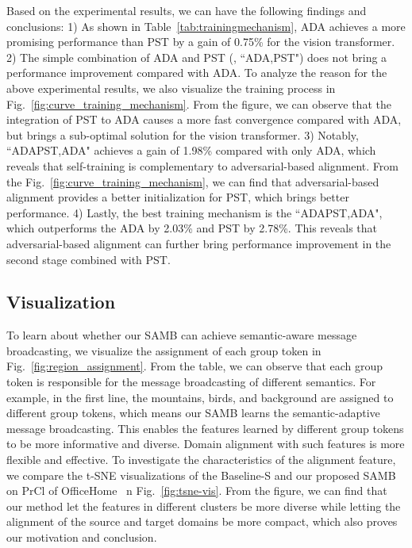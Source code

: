 \documentclass[journal]{IEEEtran}
\begin{document}
Based on the experimental results, we can have the following findings and conclusions:
1) As shown in Table~\ref{tab:trainingmechanism}, ADA achieves a more promising performance than PST by a gain of 0.75\% for the vision transformer. 2) The simple combination of ADA and PST (\ieno,  ``ADA,PST") does not bring a performance improvement compared with ADA. To analyze the reason for the above experimental results, we also visualize the training process in Fig.~\ref{fig:curve_training_mechanism}. From the figure, we can observe that the integration of PST to ADA causes a more fast convergence compared with ADA, but brings a sub-optimal solution for the vision transformer. 3) Notably, ``ADAPST,ADA" achieves a gain of 1.98\% compared with only ADA, which reveals that self-training is complementary to adversarial-based alignment. From the Fig.~\ref{fig:curve_training_mechanism}, we can find that adversarial-based alignment provides a better initialization for PST, which brings better performance. 4) Lastly, the best training mechanism is the ``ADAPST,ADA", which outperforms the ADA by 2.03\% and PST by 2.78\%. This reveals that adversarial-based alignment can further bring performance improvement in the second stage combined with PST.   














\subsection{Visualization}
\label{sec:vis}
To learn about whether our SAMB can achieve semantic-aware message broadcasting, we visualize the assignment of each group token in Fig.~\ref{fig:region_assignment}. From the table, we can observe that each group token is responsible for the message broadcasting of different semantics. For example, in the first line, the mountains, birds, and background are assigned to different group tokens, which means our SAMB learns the semantic-adaptive message broadcasting. This enables the features learned by different group tokens to be more informative and diverse.  Domain alignment with such features is more flexible and effective. To investigate the characteristics of the alignment feature, we compare the t-SNE visualizations of the Baseline-S and  our proposed SAMB on PrCl of OfficeHome~\cite{venkateswara2017deepOffice-Home}  n Fig.~\ref{fig:tsne-vis}. From the figure, we can find that our method let the features in different clusters be more diverse while letting the alignment of the source and target domains be more compact, which also proves our motivation and conclusion.  
\end{document}
